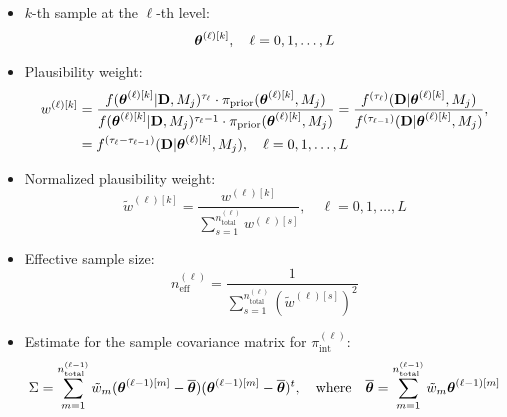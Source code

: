     
\begin{itemize}
 \item $k$-th sample at the $\ell$-th level: 
    \begin{equation}\label{eq:samples}
    \mbox{\boldmath$ \theta $}^{(\ell) [k]},   \quad \ell=0,1,\ldots, L \\ 
    \end{equation} 

 \item Plausibility weight:
    \begin{equation}
    \begin{split}\label{eq:w}
    w^{(\ell) [k]} &= \dfrac{f(\mbox{\boldmath$ \theta $}^{(\ell) [k]}|{\bf D}, M_j)^{\tau_\ell} \cdot \pi_{\text{prior}} (\mbox{\boldmath$ \theta $}^{(\ell) [k]}, M_j)}{f(\mbox{\boldmath$ \theta $}^{(\ell) [k]}|{\bf D}, M_j)^{\tau_\ell-1} \cdot \pi_{\text{prior}} (\mbox{\boldmath$ \theta $}^{(\ell) [k]}, M_j)}  
		=\dfrac{f^{(\tau_{\ell})}({\bf D} | \mbox{\boldmath$ \theta $}^{(\ell) [k]}, M_j) }{f^{(\tau_{\ell-1})}({\bf D} | \mbox{\boldmath$ \theta $}^{(\ell) [k]}, M_j)}, \\
		&= f^{(\tau_{\ell}-\tau_{\ell-1})}({\bf D} | \mbox{\boldmath$ \theta $}^{(\ell) [k]}, M_j), \quad \ell=0,1,\ldots, L \\ 
    \end{split}
    \end{equation}
    
\item Normalized plausibility weight:
    \begin{equation}\label{eq:w-tilde}
    \tilde{w}^{(\ell) [k]} = \dfrac{w^{(\ell) [k]}}{\sum_{s=1}^{n_\text{total}^{(\ell)}}  w^{(\ell) [s]} }, \quad \ell=0,1,\ldots,L 
    \end{equation}

\item Effective sample size:
    \begin{equation}\label{eq:neff}
    n_\text{eff}^{(\ell)} = \dfrac{1}{\sum_{s=1}^{n_\text{total}^{(\ell)}} \left( \tilde{w}^{(\ell) [s]}\right)^2}
    \end{equation}
    
\item Estimate for the sample covariance matrix for $\pi_\text{int}^{(\ell)}$:
    \begin{equation}\label{eq:est_cov}
     \Sigma = \sum_{m=1}^{n_\text{total}^{(\ell-1)}} \tilde{w}_{m} (\mbox{\boldmath$ \theta $}^{(\ell-1) [m]} - \overline{\mbox{\boldmath$ \theta $}}) (\mbox{\boldmath$ \theta $}^{(\ell-1) [m]} - \overline{\mbox{\boldmath$ \theta $}})^{t}, \quad \text{where} \quad
     \overline{\mbox{\boldmath$ \theta $}} = \sum_{m=1}^{n_\text{total}^{(\ell-1)}}  \tilde{w}_{m} \mbox{\boldmath$ \theta $}^{(\ell-1) [m]}
    \end{equation}

\end{itemize}


